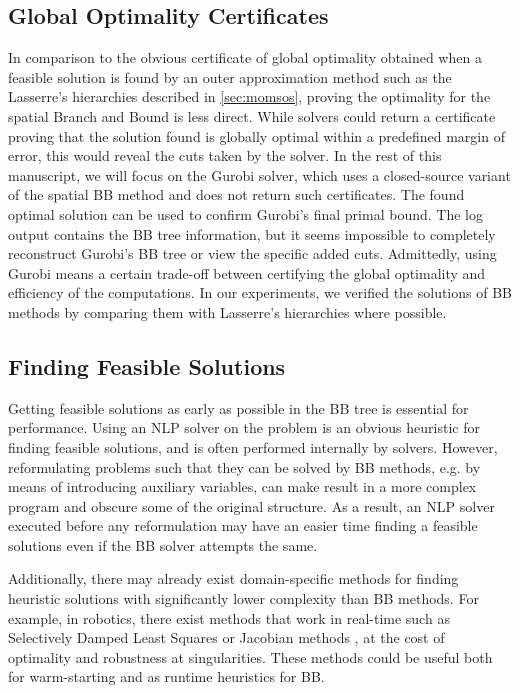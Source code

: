 \subsection{Global Optimality Certificates}
In comparison to the obvious certificate of global optimality obtained when a feasible solution is found by an outer approximation method such as the Lasserre's hierarchies described in \cref{sec:momsos}, proving the optimality for the spatial Branch and Bound is less direct.
While solvers could return a certificate proving that the solution found is globally optimal within a predefined margin of error, this would reveal the cuts taken by the solver. In the rest of this manuscript, we will focus on the Gurobi solver, which uses a closed-source variant of the spatial BB method and does not return such certificates. The found optimal solution can be used to confirm Gurobi's final primal bound. The log output contains the BB tree information, but it seems impossible to completely reconstruct Gurobi's BB tree or view the specific added cuts. Admittedly, using Gurobi means a certain trade-off between certifying the global optimality and efficiency of the computations. In our experiments, we verified the solutions of BB methods by comparing them with Lasserre's hierarchies where possible.

\subsection{Finding Feasible Solutions}
Getting feasible solutions as early as possible in the BB tree is essential for performance. Using an NLP solver on the problem is an obvious heuristic for finding feasible solutions, and is often performed internally by solvers. However, reformulating problems such that they can be solved by BB methods, e.g. by means of introducing auxiliary variables, can make result in a more complex program and obscure some of the original structure. As a result, an NLP solver executed before any reformulation may have an easier time finding a feasible solutions even if the BB solver attempts the same.

Additionally, there may already exist domain-specific methods for finding heuristic solutions with significantly lower complexity than BB methods. For example, in robotics, there exist methods that work in real-time such as Selectively Damped Least Squares \cite{BussSDLS} or Jacobian methods \cite{Pinocchio}, at the cost of optimality and robustness at singularities. These methods could be useful both for warm-starting and as runtime heuristics for BB.